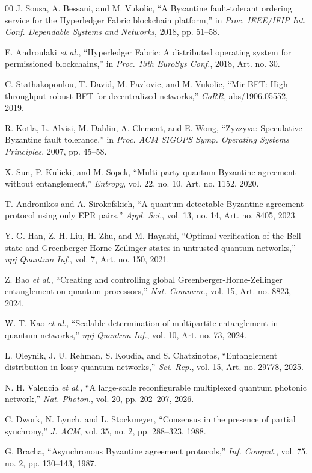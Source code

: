 \documentclass{ieeeaccess}
\begin{document}
\begin{thebibliography}{00}
 J. Sousa, A. Bessani, and M. Vukolic, ``A Byzantine fault-tolerant ordering service for the Hyperledger Fabric blockchain platform,'' in \emph{Proc. IEEE/IFIP Int. Conf. Dependable Systems and Networks}, 2018, pp. 51--58.

 E. Androulaki \emph{et al.}, ``Hyperledger Fabric: A distributed operating system for permissioned blockchains,'' in \emph{Proc. 13th EuroSys Conf.}, 2018, Art. no. 30.

 C. Stathakopoulou, T. David, M. Pavlovic, and M. Vukolic, ``Mir-BFT: High-throughput robust BFT for decentralized networks,'' \emph{CoRR}, abs/1906.05552, 2019.

 R. Kotla, L. Alvisi, M. Dahlin, A. Clement, and E. Wong, ``Zyzzyva: Speculative Byzantine fault tolerance,'' in \emph{Proc. ACM SIGOPS Symp. Operating Systems Principles}, 2007, pp. 45--58.

 X. Sun, P. Kulicki, and M. Sopek, ``Multi-party quantum Byzantine agreement without entanglement,'' \emph{Entropy}, vol. 22, no. 10, Art. no. 1152, 2020.

 T. Andronikos and A. Sirokofskich, ``A quantum detectable Byzantine agreement protocol using only EPR pairs,'' \emph{Appl. Sci.}, vol. 13, no. 14, Art. no. 8405, 2023.

 Y.-G. Han, Z.-H. Liu, H. Zhu, and M. Hayashi, ``Optimal verification of the Bell state and Greenberger-Horne-Zeilinger states in untrusted quantum networks,'' \emph{npj Quantum Inf.}, vol. 7, Art. no. 150, 2021.

 Z. Bao \emph{et al.}, ``Creating and controlling global Greenberger-Horne-Zeilinger entanglement on quantum processors,'' \emph{Nat. Commun.}, vol. 15, Art. no. 8823, 2024.

 W.-T. Kao \emph{et al.}, ``Scalable determination of multipartite entanglement in quantum networks,'' \emph{npj Quantum Inf.}, vol. 10, Art. no. 73, 2024.

 L. Oleynik, J. U. Rehman, S. Koudia, and S. Chatzinotas, ``Entanglement distribution in lossy quantum networks,'' \emph{Sci. Rep.}, vol. 15, Art. no. 29778, 2025.

 N. H. Valencia \emph{et al.}, ``A large-scale reconfigurable multiplexed quantum photonic network,'' \emph{Nat. Photon.}, vol. 20, pp. 202--207, 2026.

 C. Dwork, N. Lynch, and L. Stockmeyer, ``Consensus in the presence of partial synchrony,'' \emph{J. ACM}, vol. 35, no. 2, pp. 288--323, 1988.

 G. Bracha, ``Asynchronous Byzantine agreement protocols,'' \emph{Inf. Comput.}, vol. 75, no. 2, pp. 130--143, 1987.

\end{thebibliography}
\end{document}
